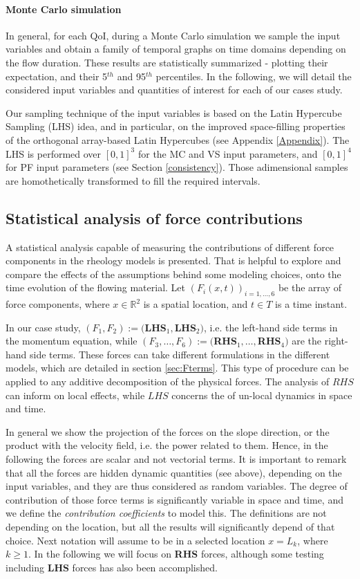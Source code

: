 \documentclass{article}
\begin{document}
\paragraph{Monte Carlo simulation} In general, for each QoI, during a Monte Carlo simulation we sample the input variables and obtain a family of temporal graphs on time domains depending on the flow duration. These results are statistically summarized - plotting their expectation, and their 5$^{th}$ and 95$^{th}$ percentiles. In the following, we will detail the considered input variables and quantities of interest for each of our cases study.

Our sampling technique of the input variables is based on the Latin Hypercube Sampling (LHS) idea, and in particular, on the improved space-filling properties of the orthogonal array-based Latin Hypercubes (see Appendix \ref{Appendix}). The LHS is performed over $[0,1]^3$ for the MC and VS input parameters, and $[0,1]^4$ for PF input parameters (see Section \ref{consistency}). Those adimensional samples are homothetically transformed to fill the required intervals.

\subsection{Statistical analysis of force contributions}\label{statF}
A statistical analysis capable of measuring the contributions of different force components in the rheology models is presented. That is helpful to explore and compare the effects of the assumptions behind some modeling choices, onto the time evolution of the flowing material. Let $(F_i(x,t))_{i=1,\dots, 6}$ be the array of force components, where $x\in\mathbb R^2$ is a spatial location, and $t\in T$ is a time instant.

In our case study, $(F_1,F_2):=($\textbf{LHS}$_1,$\textbf{LHS}$_2)$, i.e. the left-hand side terms in the momentum equation, while $(F_3,\dots,F_6):=($\textbf{RHS}$_1,\dots,$\textbf{RHS}$_4)$ are the right-hand side terms. These forces can take different formulations in the different models, which are detailed in section \ref{sec:Fterms}. This type of procedure can be applied to any additive decomposition of the physical forces. The analysis of $RHS$ can inform on local effects, while $LHS$ concerns the of un-local dynamics in space and time.

In general we show the projection of the forces on the slope direction, or the product with the velocity field, i.e. the power related to them. Hence, in the following the forces are scalar and not vectorial terms. It is important to remark that all the forces are hidden dynamic quantities (see above), depending on the input variables, and they are thus considered as random variables. The degree of contribution of those force terms is significantly variable in space and time, and we define the \emph{contribution coefficients} to model this. The definitions are not depending on the location, but all the results will significantly depend of that choice. Next notation will assume to be in a selected location $x=L_k$, where $k\ge 1$. In the following we will focus on \textbf{RHS} forces, although some testing including \textbf{LHS} forces has also been accomplished.
\end{document}
